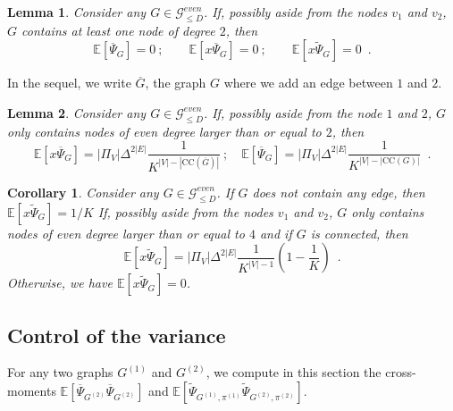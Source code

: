 \documentclass{article}
\newtheorem{corollary}{Corollary}
\newtheorem{lemma}{Lemma}
\begin{document}
\begin{lemma}\label{lem:first_moment_degree2}
Consider any $G\in \mathcal{G}_{\leq D}^{even}$.  If, possibly aside from the nodes $v_1$ and $v_2$, $G$ contains at least one node of degree $2$, then 
$$\mathbb{E}[\overline{\Psi}_G]=0\ ; \quad \quad \mathbb{E}[x\overline{\Psi}_G]=0\ ;\quad \quad \mathbb{E}[x\widetilde{\Psi}_G]=0 \enspace .$$
\end{lemma}





In the sequel, we write $\overline{G}$, the graph $G$ where we add an edge between $1$ and $2$.

\begin{lemma}\label{lem:first_moment} Consider any $G\in \mathcal{G}_{\leq D}^{even}$. 
    If, possibly aside from the node $1$ and $2$,  $G$ only contains nodes of even degree larger than or equal to $2$, then
    \begin{equation}\label{eq:moment_first_degree}
    \mathbb{E}[x\overline{\Psi}_G]= |\Pi_V| \Delta^{2|E|}\frac{1}{K^{|V|-|\mathrm{CC}(\overline{G})|}}\ ; \quad \mathbb{E}[\overline{\Psi}_G]= |\Pi_V| \Delta^{2|E|}\frac{1}{K^{|V|-|\mathrm{CC}(G)|}}\enspace . 
    \end{equation}
\end{lemma}
    



\begin{corollary}\label{cor:first_moment}
     Consider any $G\in \mathcal{G}_{\leq D}^{even}$. If $G$ does not contain any edge, then  $\mathbb{E}[x\widetilde{\Psi}_G]=1/K$
      If, possibly aside from the nodes $v_1$ and $v_2$,  $G$ only contains nodes of even degree larger than or equal to $4$ and if $G$ is connected, then
    \begin{equation}\label{eq:moment_first_degreetilde}
    \mathbb{E}[x\widetilde{\Psi}_G]= |\Pi_V| \Delta^{2|E|}\frac{1}{K^{|V|-1}} \left(1 - \frac{1}{K}\right)\enspace .
    \end{equation}
    Otherwise, we have $\mathbb{E}[x\widetilde{\Psi}_G]= 0$.
\end{corollary}



\subsection{Control of the variance}



For any two graphs $G^{(1)}$ and $G^{(2)}$, we compute in this section the cross-moments $\mathbb{E}[\overline{\Psi}_{G^{(2)}} \overline{\Psi}_{G^{(2)}}]$ and $\mathbb{E}[\widetilde{\Psi}_{G^{(1)},\pi^{(1)}} \widetilde{\Psi}_{G^{(2)},\pi^{(2)}}]$. 
\end{document}
